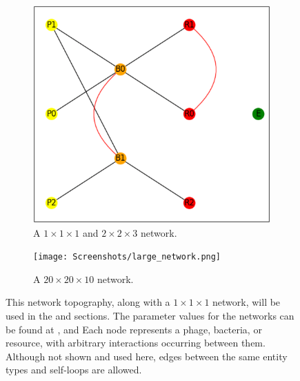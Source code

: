 \begin{figure}
\begin{subfigure}{0.49\linewidth}
        \includegraphics[width=\linewidth]{Screenshots/example_network.png}
        \caption{
            A $1\times1\times1$ and $2\times 2 \times 3$ network. 
        }
        \label{fig:ss:example_network}
    \end{subfigure} 
    \begin{subfigure}{0.49\linewidth}
        \centering
        \captionsetup{width=1\linewidth}
        \texttt{[image: Screenshots/large\_network.png]}
        \caption{
            A $20\times20\times10$ network. 
        }
        \label{fig:ss:example_large_network}
    \end{subfigure} 
    \caption{
        This network topography, along with a $1 \times 1 \times 1$ network, will be used in the  and  sections. 
        The parameter values for the networks can be found at ,  and 
        Each node represents a phage, bacteria, or resource, with arbitrary interactions occurring between them. 
        Although not shown and used here, edges between the same entity types and self-loops are allowed. 
    }
    \label{fig:ss:GUI_tool_and_network}
\end{figure}

